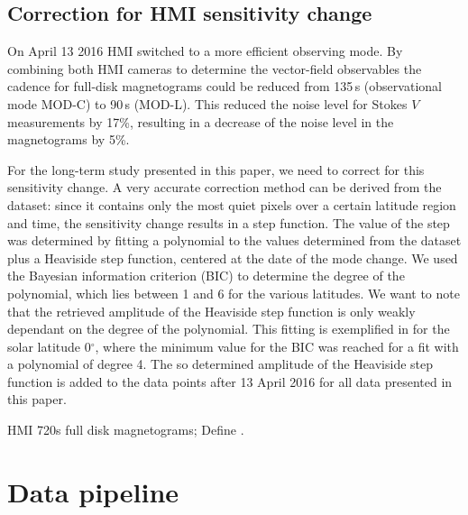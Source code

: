 \documentclass{aa}
\begin{document}
\subsection{Correction for HMI sensitivity change}

On April 13 2016 HMI switched to a more efficient observing mode. By combining both HMI cameras to determine the vector-field observables the cadence for full-disk magnetograms could be reduced from 135\,s (observational mode MOD-C) to 90\,s (MOD-L). This reduced the noise level for Stokes $V$ measurements by 17\%, resulting in a decrease of the noise level in the \los{} magnetograms by 5\%.

For the long-term study presented in this paper, we need to correct for this sensitivity change. A very accurate correction method can be derived from the \IN{} dataset: since it contains only the most quiet pixels over a certain latitude region and time, the sensitivity change results in a step function. The value of the step was determined by fitting a polynomial to the \brms{} values determined from the \IN{} dataset plus a Heaviside step function, centered at the date of the mode change. We used the Bayesian information criterion (BIC) to determine the degree of the polynomial, which lies between 1 and 6 for the various latitudes. We want to note that the retrieved amplitude of the Heaviside step function is only weakly dependant on the degree of the polynomial. This fitting is exemplified in  for the solar latitude 0$^\circ$, where the minimum value for the BIC was reached for a fit with a polynomial of degree 4. The so determined amplitude of the Heaviside step function is added to the data points after 13 April 2016 for all data presented in this paper.



HMI 720s full disk magnetograms; 
Define \brms{}.

\section{Data pipeline}
%
\end{document}
